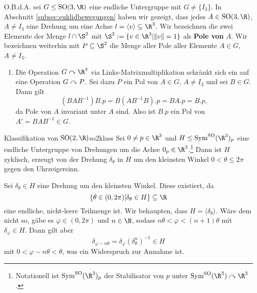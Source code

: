 \begin{beweis}
O.B.d.A. sei $G \leq \text{SO}(3,\R)$ eine endliche Untergruppe mit $G \neq \{I_3\}$. In Abschnitt \ref{subsec:euklidbewegungen} haben wir gezeigt, dass jedes $A \in \text{SO}(3,\R)$, $A \neq I_3$ eine Drehung um eine Achse $l = \langle v \rangle \sub \R^3$. Wir bezeichnen die zwei Elemente der Menge $l \cap \S^2$ mit $\S^2 := \{ v \in \R^3| \|v\| = 1\}$ als \textbf{Pole von} $A$. Wir bezeichnen weiterhin mit $P \sub \S^2$ die Menge aller Pole aller Elemente $A \in G$, $A \neq I_3$.
\begin{enumerate}
\item Die Operation $G \acts \R^3$ via Links-Matrixmultiplikation schränkt sich ein auf eine Operation $G \curvearrowright P$. Sei dazu $P$ ein Pol von $A \in G$, $A \neq I_3$ und sei $B \in G$. Dann gilt
\begin{equation}
(BAB^{-1})B.p = B(AB^{-1}B).p = BA.p = B.p,
\end{equation}
da Pole von $A$ invariant unter $A$ sind. Also ist $B.p$ ein Pol von $A' = B AB^{-1} \in G$.
\end{enumerate}
\end{beweis}
\begin{lemma}{Klassifikation von $\text{SO}(2,\R)$}{so2klass}
Sei $0 \neq p \in \R^3$ und $H \leq \Symso (\R^3)_p$ eine endliche Untergruppe von Drehungen um die Achse $0_p \in \R^3$.\footnote{Notationell ist $\Symso (\R^3)_p$ der Stabilisator von $p$ unter $\Symso (\R^3) \acts \R^3$.} Dann ist $H$ zyklisch, erzeugt von der Drehung $\delta_\theta$ in $H$ um den kleinsten Winkel $0<\theta \leq 2\pi$ gegen den Uhrzeigersinn.
\end{lemma}
\begin{beweis}
Sei $\delta_\theta \in H$ eine Drehung um den kleinsten Winkel. Diese existiert, da 
\begin{equation}
\{\theta \in (0,2\pi)|\delta_\theta \in H\} \sub \R
\end{equation}
eine endliche, nicht-leere Teilmenge ist. Wir behaupten, dass $H = \langle \delta_\theta \rangle$. Wäre dem nicht so, gäbe es $\varphi \in (0,2\pi)$ und $n \in \N$, sodass $n\theta < \varphi < (n+1) \theta$ mit $\delta_\varphi \in H$. Dann gilt aber 
\begin{equation}
\delta_{\varphi - n\theta} = \delta_\varphi (\delta_\theta^n)^{-1} \in H
\end{equation}
mit $0 < \varphi - n\theta < \theta$, was ein Widerspruch zur Annahme ist.
\end{beweis}
